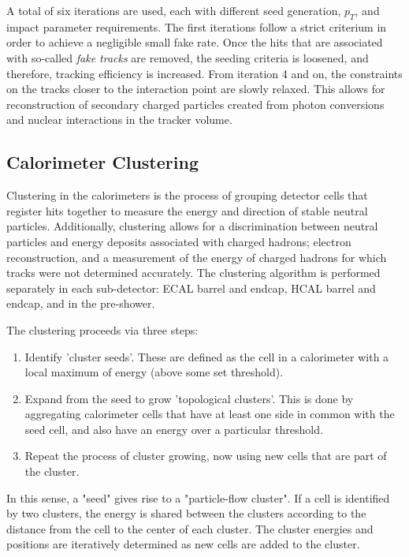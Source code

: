 A total of six iterations are used, each with different seed generation, $p_{T}$, and impact parameter requirements. The first iterations follow a strict criterium in order to achieve a negligible small fake rate. Once the hits that are associated with so-called \textit{fake tracks} are removed, the seeding criteria is loosened, and therefore, tracking efficiency is increased. From iteration 4 and on, the constraints on the tracks closer to the interaction point are slowly relaxed. This allows for reconstruction of secondary charged particles created from photon conversions and nuclear interactions in the tracker volume.

\subsection{Calorimeter Clustering}
Clustering in the calorimeters is the process of grouping detector cells that register hits together to measure the energy and direction of stable neutral particles. Additionally, clustering allows for a discrimination between neutral particles and energy deposits associated with charged hadrons; electron reconstruction, and a measurement of the energy of charged hadrons for which tracks were not determined accurately. The clustering algorithm is performed separately in each sub-detector: ECAL barrel and endcap, HCAL barrel and endcap, and in the pre-shower.

The clustering proceeds via three steps\cite{CMS:2009nxa}:

\begin{enumerate}
	\item Identify 'cluster seeds'. These are defined as the cell in a calorimeter with a local maximum of energy (above some set threshold).
	\item Expand from the seed to grow 'topological clusters'. This is done by aggregating calorimeter cells that have at least one side in common with the seed cell, and also have an energy over a particular threshold.
	\item Repeat the process of cluster growing, now using new cells that are part of the cluster.
\end{enumerate}

In this sense, a "seed" gives rise to a "particle-flow cluster". If a cell is identified by two clusters, the energy is shared between the clusters according to the distance from the cell to the center of each cluster. The cluster energies and positions are iteratively determined as new cells are added to the cluster.

